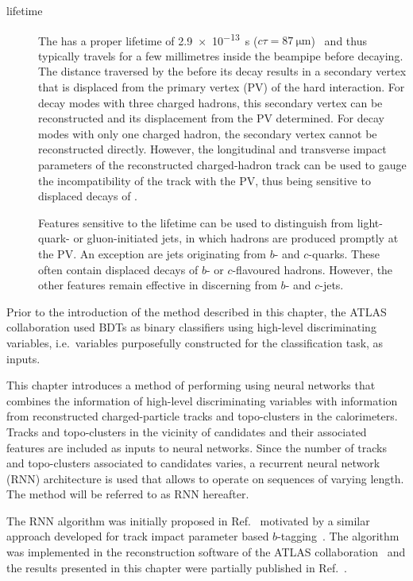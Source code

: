 \begin{description}
\item[\taulepton lifetime] The \taulepton has a proper lifetime of
  \SI{2.9e-13}{\second} ($c \tau = \SI{87}{\micro\metre}$)~\cite{pdg2020} and
  thus typically travels for a few millimetres inside the beampipe before
  decaying. The distance traversed by the \taulepton before its decay results in
  a secondary vertex that is displaced from the primary vertex (PV) of the hard
  interaction. For \taulepton decay modes with three charged hadrons, this
  secondary vertex can be reconstructed and its displacement from the PV
  determined. For decay modes with only one charged hadron, the secondary vertex
  cannot be reconstructed directly. However, the longitudinal and transverse
  impact parameters of the reconstructed charged-hadron track can be used to
  gauge the incompatibility of the track with the PV, thus being sensitive to
  displaced decays of \tauleptons.

  Features sensitive to the \taulepton lifetime can be used to distinguish
  \tauhad from light-quark- or gluon-initiated jets, in which hadrons are
  produced promptly at the PV. An exception are jets originating from $b$- and
  $c$-quarks. These often contain displaced decays of $b$- or $c$-flavoured
  hadrons. However, the other features remain effective in discerning \tauhad
  from $b$- and $c$-jets.

\end{description}
Prior to the introduction of the method described in this chapter, the
ATLAS collaboration used BDTs as binary classifiers using high-level
discriminating variables, i.e.\ variables purposefully constructed for
the classification task, as inputs.

This chapter introduces a method of performing \tauid using neural networks that
combines the information of high-level discriminating variables with information
from reconstructed charged-particle tracks and topo-clusters in the
calorimeters. Tracks and topo-clusters in the vicinity of \tauhadvis candidates
and their associated features are included as inputs to neural networks. Since
the number of tracks and topo-clusters associated to \tauhadvis candidates
varies, a recurrent neural network (RNN) architecture is used that allows to
operate on sequences of varying length. The method will be referred to as RNN
\tauid hereafter.

The RNN \tauid algorithm was initially proposed in
Ref.~\cite{cdeutsch-master} motivated by a similar approach developed
for track impact parameter based
$b$-tagging~\cite{ATL-PHYS-PUB-2017-003}. The algorithm was
implemented in the reconstruction software of the ATLAS
collaboration~\cite{ATL-SOFT-PUB-2021-001} and the results presented
in this chapter were partially published in
Ref.~\cite{ATL-PHYS-PUB-2019-033}. %


